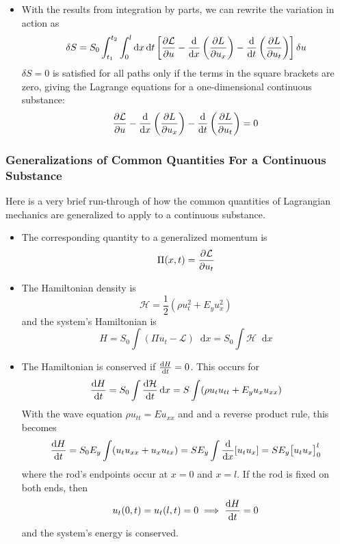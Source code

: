 \documentclass[11pt, a4paper]{article}
\newcommand{\diff}{\mathop{}\!\mathrm{d}} %
\begin{document}
\begin{itemize}
	\item With the results from integration by parts, we can rewrite the variation in action as
	\begin{equation*}
		\delta S = S_{0} \int_{t_{1}}^{t_{2}} \int_{0}^{l} \diff x \diff t \left[\pdv{\mathcal{L}}{u} - \dv{}{x} \left(\pdv{L}{u_{x}}\right) - \dv{}{t} \left(\pdv{L}{u_{t}}\right) \right] \delta u
	\end{equation*}
	$ \delta S = 0 $ is satisfied for all paths only if the terms in the square brackets are zero, giving the Lagrange equations for a one-dimensional continuous substance:
	\begin{equation*}
		\pdv{\mathcal{L}}{u} - \dv{}{x} \left(\pdv{L}{u_{x}}\right) - \dv{}{t} \left(\pdv{L}{u_{t}}\right) = 0
	\end{equation*}
	
\end{itemize}

\subsubsection{Generalizations of Common Quantities For a Continuous Substance}
Here is a very brief run-through of how the common quantities of Lagrangian mechanics are generalized to apply to a continuous substance.
\begin{itemize}
	\item The corresponding quantity to a generalized momentum is
	\begin{equation*}
		\Pi(x, t) = \pdv{\mathcal{L}}{u_{t}}
	\end{equation*}
	
	\item The Hamiltonian density is
	\begin{equation*}
		\mathcal{H} = \frac{1}{2}\left(\rho u_{t}^{2} + E_{y}u_{x}^{2}\right)
	\end{equation*}
	and the system's Hamiltonian is
	\begin{equation*}
		H = S_{0} \int (\Pi u_{t} - \mathcal{L}) \diff x = S_{0} \int \mathcal{H}\diff x
	\end{equation*}
	
	\item The Hamiltonian is conserved if $ \dv{H}{t} = 0 $. This occurs for
	\begin{equation*}
		\dv{H}{t} = S_{0}\int \dv{\mathcal{H}}{t}\diff x = S \int (\rho u_{t}u_{tt} + E_{y} u_{x} u_{xx})
	\end{equation*}
	With the wave equation $ \rho u_{tt} = Eu_{xx} $ and and a reverse product rule, this becomes
	\begin{equation*}
		\dv{H}{t} = S_{0}E_{y} \int (u_{t}u_{xx} + u_{x} u_{tx}) = SE_{y}\int \dv{}{x}[u_{t}u_{x}] = SE_{y} \big[u_{t}u_{x}\big]_{0}^{l}
	\end{equation*}
	where the rod's endpoints occur at $ x = 0 $ and $ x = l $. If the rod is fixed on both ends, then
	\begin{equation*}
		u_{t}(0, t) = u_{t}(l, t) = 0 \implies \dv{H}{t} = 0
	\end{equation*}
	and the system's energy is conserved.
	
\end{itemize}
\end{document}

